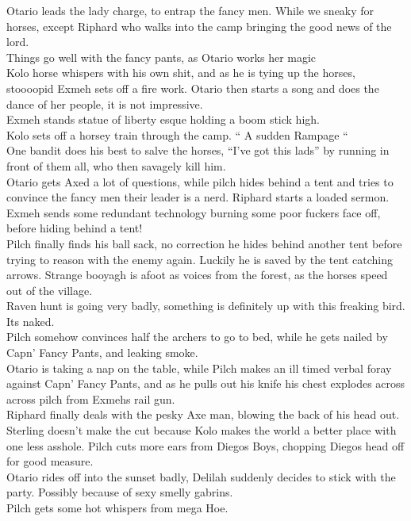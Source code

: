 Otario leads the lady charge, to entrap the fancy men. While we sneaky for horses, except Riphard who walks into the camp bringing the good news of the lord.\\
Things go well with the fancy pants, as Otario works her magic\\
Kolo horse whispers with his own shit, and as he is tying up the horses, stoooopid Exmeh sets off a fire work. Otario then starts a song and does the dance of her people, it is not impressive.\\
Exmeh stands statue of liberty esque holding a boom stick high.\\
Kolo sets off a horsey train through the camp. “ A sudden Rampage “\\
One bandit does his best to salve the horses, “I’ve got this lads” by running in front of them all, who then savagely kill him.\\
Otario gets Axed a lot of questions, while pilch hides behind a tent and tries to convince the fancy men their leader is a nerd. Riphard starts a loaded sermon. Exmeh sends some redundant technology burning some poor fuckers face off, before hiding behind a tent!\\
Pilch finally finds his ball sack, no correction he hides behind another tent before trying to reason with the enemy again. Luckily he is saved by the tent catching arrows. Strange booyagh is afoot as voices from the forest, as the horses speed out of the village.\\
Raven hunt is going very badly, something is definitely up with this freaking bird. Its naked.\\
Pilch somehow convinces half the archers to go to bed, while he gets nailed by Capn’ Fancy Pants, and leaking smoke.\\
Otario is taking a nap on the table, while Pilch makes an ill timed verbal foray against Capn’ Fancy Pants, and as he pulls out his knife his chest explodes across across pilch from Exmehs rail gun.\\
Riphard finally deals with the pesky Axe man, blowing the back of his head out.\\
Sterling doesn’t make the cut because Kolo makes the world a better place with one less asshole. Pilch cuts more ears from Diegos Boys, chopping Diegos head off for good measure.\\
Otario rides off into the sunset badly, Delilah suddenly decides to stick with the party. Possibly because of sexy smelly gabrins.\\
Pilch gets some hot whispers from mega Hoe.\\
